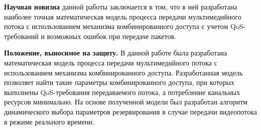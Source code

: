 

\textbf{Научная новизна} данной работы заключается в том, что в ней разработана наиболее точная математическая модель процесса передачи мультимедийного потока с использованием механизма комбинированного доступа с учетом QoS-требований и возможных ошибок при передаче пакетов. 

\textbf{Положение, выносимое на защиту.} В данной работе была разработана математическая модель процесса передачи мультимедийного потока с использованием механизма комбинированного доступа. Разработанная модель позволяет найти такие параметры комбинированного доступа, при которых выполнены QoS-требования передаваемого потока, а потребление канальных ресурсов минимально. На основе полученной модели был разработан алгоритм динамического выбора параметров резервирования в случае передачи видеопотока в режиме реального времени.


